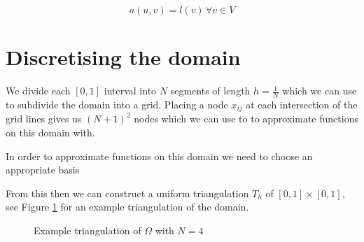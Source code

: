 \begin{equation}\label{eq:weak_formulation}
    a(u,v) = l(v)\, \forall v \in V
\end{equation}

\section{Discretising the domain}

We divide each $[0,1]$ interval into $N$ segments of length $h = \frac{1}{N}$ 
which we can use to subdivide the domain into a grid. Placing a node $x_{ij}$ at 
each intersection of the grid lines gives us $(N + 1)^2$ nodes which we can use to
to approximate functions on this domain with.

In order to approximate functions on this domain we need to choose an appropriate
basis

From this then  we can construct a uniform triangulation $T_h$ of
$[0,1] \times [0,1]$, see Figure \ref{fig:example_triangulation} for an example 
triangulation of the domain.

\begin{figure}\label{fig:example_triangulation}
\centering
{}
\caption{Example triangulation of $\Omega$ with $N = 4$}
\end{figure}



